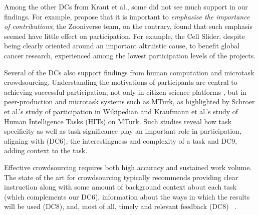 \documentclass{sigchi}
\begin{document}
\begin{spacing}{0.97}
Among the other DCs from Kraut et al., some did not see much support in our findings. For example, propose that it is important to \emph{emphasise the importance of contributions}; the Zooniverse team, on the contrary, found that such emphasis seemed have little effect on participation. For example, the Cell Slider, despite being clearly oriented around an important altruistic cause, to benefit global cancer research, experienced among the lowest participation levels of the projects.


Several of the DCs also support findings from human computation and microtask crowdsourcing. Understanding the motivations of participants are central to achieving successful participation, not only in citizen science platforms \cite{rotman2012}, but in peer-production and microtask systems such as MTurk, as highlighted by Schroer et al.'s study of participation in Wikipedian \cite{Schroer2009} and Kraufmann et al.'s \cite{kaufmann_more_2011} study of Human Intelligence Tasks (HITs) on MTurk. Such studies reveal how task specificity as well as task significance play an important role in participation, aligning with (DC6), the interestingness and complexity of a task and DC9, adding context to the task.

Effective crowdsourcing requires both high accuracy and sustained work volume. The state of the art for crowdsourcing typically recommends providing clear instruction along with some amount of background context about each task (which complements our DC6), information about the ways in which the results will be used (DC8), and, most of all, timely and relevant feedback (DC8)~ \cite{dawson2012getting}.%



\end{spacing}
\end{document}
